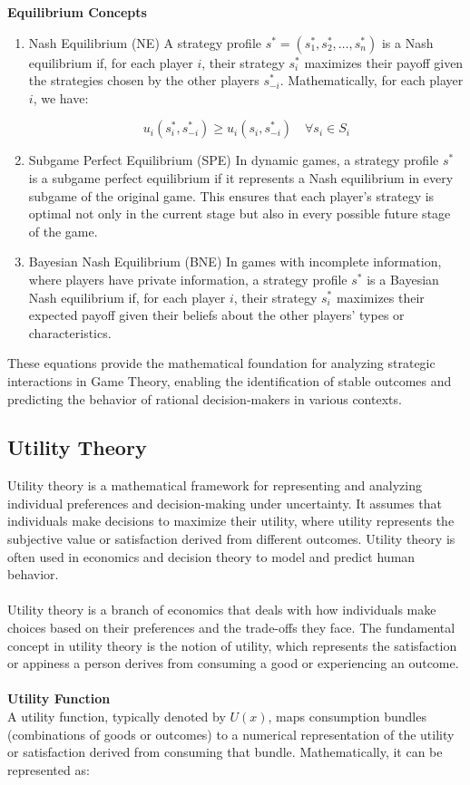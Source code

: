 \documentclass[12pt]{article}
\begin{document}
\noindent \textbf{Equilibrium Concepts}\\
\begin{enumerate}
\item Nash Equilibrium (NE)
A strategy profile \(s^* = (s_1^*, s_2^*, \ldots, s_n^*)\) is a Nash equilibrium if, for each player \(i\), their strategy \(s_i^*\) maximizes their payoff given the strategies chosen by the other players \(s_{-i}^*\). Mathematically, for each player \(i\), we have:

\begin{equation}
 u_i(s_i^*, s_{-i}^*) \geq u_i(s_i, s_{-i}^*) \quad \forall s_i \in S_i 
\end{equation}
\item Subgame Perfect Equilibrium (SPE)
In dynamic games, a strategy profile \(s^*\) is a subgame perfect equilibrium if it represents a Nash equilibrium in every subgame of the original game. This ensures that each player's strategy is optimal not only in the current stage but also in every possible future stage of the game.

\item Bayesian Nash Equilibrium (BNE)
In games with incomplete information, where players have private information, a strategy profile \(s^*\) is a Bayesian Nash equilibrium if, for each player \(i\), their strategy \(s_i^*\) maximizes their expected payoff given their beliefs about the other players' types or characteristics.
\end{enumerate}

\noindent These equations provide the mathematical foundation for analyzing strategic interactions in Game Theory, enabling the identification of stable outcomes and predicting the behavior of rational decision-makers in various contexts.

\subsection{Utility Theory}\label{ut}
Utility theory is a mathematical framework for representing and analyzing
individual preferences and decision-making under uncertainty. It assumes
that individuals make decisions to maximize their utility, where utility
represents the subjective value or satisfaction derived from different
outcomes. Utility theory is often used in economics and decision theory
to model and predict human behavior.\\
\\
Utility theory is a branch of economics that deals with how individuals make choices
based on their preferences and the trade-offs they face. The fundamental concept
in utility theory is the notion of utility, which represents the satisfaction or 
appiness a person derives from consuming a good or experiencing an outcome.\\
\\
\textbf{Utility Function}\\
A utility function, typically denoted by \( U(x) \), maps consumption bundles
(combinations of goods or outcomes) to a numerical representation of the utility or
satisfaction derived from consuming that bundle. Mathematically, it can be represented as:\\
\end{document}
